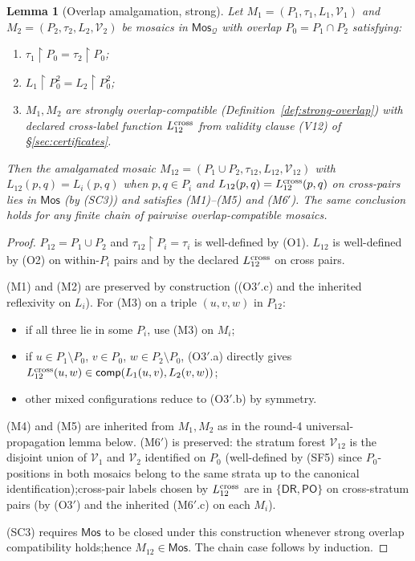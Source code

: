 \documentclass[11pt]{article}
\newtheorem{lemma}[theorem]{Lemma}
\newcommand{\DR}{\mathsf{DR}}
\newcommand{\PO}{\mathsf{PO}}
\newcommand{\comp}{\mathsf{comp}}
\newcommand{\Q}{\mathcal Q}
\newcommand{\Mos}{\mathsf{Mos}}
\begin{document}
\begin{lemma}[Overlap amalgamation, strong]\label{lem:overlap}
Let $M_1=(P_1,\tau_1,L_1,\mathcal V_1)$ and
$M_2=(P_2,\tau_2,L_2,\mathcal V_2)$ be mosaics in $\Mos_\Q$ with
overlap $P_0=P_1\cap P_2$ satisfying:
\begin{enumerate}[label=\textnormal{(O\arabic*)},leftmargin=3em]
  \item $\tau_1\restriction P_0=\tau_2\restriction P_0$;
  \item $L_1\restriction P_0^2=L_2\restriction P_0^2$;
  \item $M_1,M_2$ are strongly overlap-compatible
    (Definition~\ref{def:strong-overlap}) with declared cross-label
    function $L_{12}^{\rm cross}$ from validity clause (V12) of
    \S\ref{sec:certificates}.
\end{enumerate}
Then the amalgamated mosaic
$M_{12}=(P_1\cup P_2,\tau_{12},L_{12},\mathcal V_{12})$ with
\(
  L_{12}(p,q)=L_i(p,q)
\)
when $p,q\in P_i$ and $L_{12}(p,q)=L_{12}^{\rm cross}(p,q)$ on
cross-pairs lies in $\Mos$ (by (SC3)) and satisfies (M1)--(M5) and
(M6$'$).  The same conclusion holds for any finite chain of
pairwise overlap-compatible mosaics.
\end{lemma}

\begin{proof}
$P_{12}=P_1\cup P_2$ and $\tau_{12}\restriction P_i=\tau_i$ is
well-defined by (O1).  $L_{12}$ is well-defined by (O2) on
within-$P_i$ pairs and by the declared $L_{12}^{\rm cross}$ on
cross pairs.

(M1) and (M2) are preserved by construction
((O3$'$.c) and the inherited reflexivity on $L_i$).  For (M3) on a
triple $(u,v,w)$ in $P_{12}$:
\begin{itemize}
\item if all three lie in some $P_i$, use (M3) on $M_i$;
\item if $u\in P_1\setminus P_0$, $v\in P_0$, $w\in P_2\setminus
P_0$, (O3$'$.a) directly gives
$L_{12}^{\rm cross}(u,w)\in\comp(L_1(u,v),L_2(v,w))$;
\item other mixed configurations reduce to (O3$'$.b) by symmetry.
\end{itemize}
(M4) and (M5) are inherited from $M_1,M_2$ as in the round-4
universal-propagation lemma below.  (M6$'$) is preserved: the
stratum forest $\mathcal V_{12}$ is the disjoint union of
$\mathcal V_1$ and $\mathcal V_2$ identified on $P_0$ (well-defined
by (SF5) since $P_0$-positions in both mosaics belong to the same
strata up to the canonical identification);\@ cross-pair labels
chosen by $L_{12}^{\rm cross}$ are in $\{\DR,\PO\}$ on
cross-stratum pairs (by (O3$'$) and the inherited (M6$'$.c) on
each $M_i$).

(SC3) requires $\Mos$ to be closed under this construction whenever
strong overlap compatibility holds;\@ hence $M_{12}\in\Mos$.  The
chain case follows by induction.
\end{proof}
\end{document}

